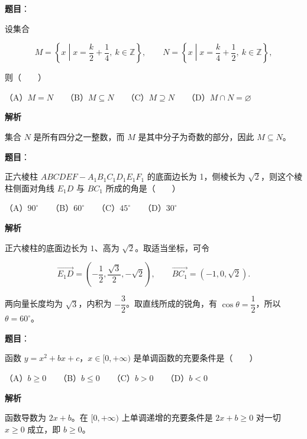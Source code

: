 \begin{answer}

\textbf{题目}：

设集合

\nopagebreak[4]
\[
M=\left\{x\middle|x=\frac{k}{2}+\frac14,\ k\in\mathbb Z\right\},\qquad
N=\left\{x\middle|x=\frac{k}{4}+\frac12,\ k\in\mathbb Z\right\},
\]

则\mbox{（　　）}

（A）$M=N$　　（B）$M\subseteq N$　　（C）$M\supseteq N$　　（D）$M\cap N=\varnothing$

\textbf{解析}

集合 $N$ 是所有四分之一整数，而 $M$ 是其中分子为奇数的部分，因此 $M\subseteq N$。


\end{answer}
\begin{answer}

\textbf{题目}：

正六棱柱 $ABCDEF-A_1B_1C_1D_1E_1F_1$ 的底面边长为 1，侧棱长为 $\sqrt2$，则这个棱柱侧面对角线 $E_1D$ 与 $BC_1$ 所成的角是\mbox{（　　）}

（A）$90^\circ$　　（B）$60^\circ$　　（C）$45^\circ$　　（D）$30^\circ$

\textbf{解析}

正六棱柱的底面边长为 $1$、高为 $\sqrt2$。取适当坐标，可令

\nopagebreak[4]
\[
\overrightarrow{E_1D}=\left(-\frac12,\frac{\sqrt3}{2},-\sqrt2\right),\qquad
\overrightarrow{BC_1}=(-1,0,\sqrt2).
\]

两向量长度均为 $\sqrt3$，内积为 $-\dfrac32$。取直线所成的锐角，有 $\cos\theta=\dfrac12$，所以 $\theta=60^\circ$。


\end{answer}
\begin{answer}

\textbf{题目}：

函数 $y=x^2+bx+c$，$x\in[0,+\infty)$ 是单调函数的充要条件是\mbox{（　　）}

（A）$b\geqslant0$　　（B）$b\leqslant0$　　（C）$b>0$　　（D）$b<0$

\textbf{解析}

函数导数为 $2x+b$。在 $[0,+\infty)$ 上单调递增的充要条件是 $2x+b\geqslant0$ 对一切 $x\geqslant0$ 成立，即 $b\geqslant0$。


\end{answer}
